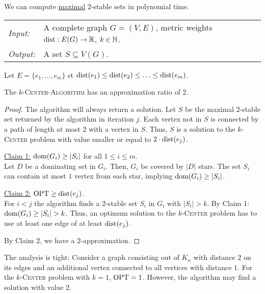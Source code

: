 \documentclass[../skript.tex]{subfiles}
\begin{document}
We can compute \underline{maximal} 2-stable sets in polynomial time.
\begin{algorithmbox}
\begin{tabular}{@{}ll}
\textit{Input:} & A complete graph $G = (V, E)$, metric weights $\operatorname*{dist} : E(G) \to \mathbb{R}$, $k \in \mathbb{N}$. \\
\textit{Output:} & A set $S \subseteq V(G)$.
\end{tabular}
\end{algorithmbox}
\vspace{-7pt}
\begin{algorithm}[H]
Let $E = \{ e_1, \ldots, e_m \}$ \ac{st} $\operatorname*{dist}(e_1) \leq \operatorname*{dist}(e_2) \leq \ldots \leq \operatorname*{dist}(e_m)$.\;
\end{algorithm}
\vspace{-7pt}
\EndAlgorithmLine
\begin{theorem} %
\label{thm:25}
The \textsc{$k$-Center-Algorithm} has an approximation ratio of $2$.
\end{theorem}
\begin{proof}
The algorithm will always return a solution.
Let $S$ be the maximal $2$-stable set returned by the algorithm in iteration $j$.
Each vertex not in $S$ is connected by a path of length at most $2$ with a vertex in $S$.
Thus, $S$ is a solution to the \textsc{$k$-Center} problem with value smaller or equal to $2 \cdot \operatorname*{dist}(e_j)$.

\underline{Claim 1:} $\operatorname{dom}(G_i) \geq |S_i|$ for all $1 \leq i \leq m$. \\
Let $D$ be a dominating set in $G_i$. Then, $G_i$ be covered by $|D|$ stars. The set $S_i$ can contain at most $1$ vertex from each star, implying $\operatorname{dom}(G_i) \geq |S_i|$.

\underline{Claim 2:} $\operatorname{OPT} \geq \operatorname*{dist}(e_j)$. \\
For $i < j$ the algorithm finds a 2-stable set $S_i$ in $G_i$ with $|S_i| > k$. By Claim 1: $\operatorname{dom}(G_i) \geq |S_i| > k$.
Thus, an optimum solution to the \textsc{$k$-Center} problem has to use at least one edge of at least $\operatorname*{dist}(e_j)$.

By Claim 2, we have a 2-approximation.
\end{proof} 
\begin{remark}
The analysis is tight:
Consider a graph consisting out of $K_n$ with distance $2$ on its edges and an additional vertex connected to all vertices with distance $1$. For the \textsc{$k$-Center} problem with $k = 1$, $\operatorname{OPT} = 1$. However, the algorithm may find a solution with value $2$.
\end{remark}
\end{document}
